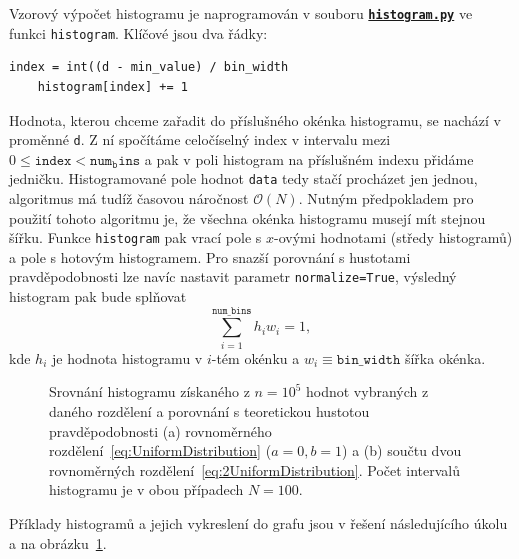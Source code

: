 \documentclass[a4paper,11pt,twoside]{article}
\def\code#1{\textnormal{\texttt{#1}}}
\def\ghfile#1#2{\textnormal{\textbf{\texttt{\href{https://github.com/PavelStransky/PCInPhysics2021/blob/main/#1#2}{#2}}}}}
\theoremstyle{red}
\theoremstyle{green}
\begin{document}
    \begin{solution}
        Vzorový výpočet histogramu je naprogramován v souboru \ghfile{python/histogram/}{histogram.py} ve funkci \code{histogram}.
        Klíčové jsou dva řádky:

        \begin{lstlisting}[style=NormalPython]
    index = int((d - min_value) / bin_width
    histogram[index] += 1\end{lstlisting}
        Hodnota, kterou chceme zařadit do příslušného okénka histogramu, se nachází v proměnné \code{d}.
        Z ní spočítáme celočíselný index v intervalu mezi $0\leq\mathtt{index}<\mathtt{num_bins}$ a pak v poli histogram na příslušném indexu přidáme jedničku.
        Histogramované pole hodnot \code{data} tedy stačí procházet jen jednou, algoritmus má tudíž časovou náročnost $\mathcal{O}(N)$.
        Nutným předpokladem pro použití tohoto algoritmu je, že všechna okénka histogramu musejí mít stejnou šířku.
        Funkce \code{histogram} pak vrací pole s $x$-ovými hodnotami (středy histogramů) a pole s hotovým histogramem.
        Pro snazší porovnání s hustotami pravděpodobnosti lze navíc nastavit parametr \code{normalize=True}, výsledný histogram pak bude splňovat
        \begin{equation}
            \sum_{i=1}^{\mathtt{num\_bins}}h_{i}w_{i}=1,
        \end{equation}
        kde $h_{i}$ je hodnota histogramu v $i$-tém okénku a $w_{i}\equiv\mathtt{bin\_width}$ šířka okénka.

        \begin{figure}[!htbp]
            \begin{subfigure}{0.49\linewidth}
                \centering{}
                \caption{}
            \end{subfigure}
            \hfill
            \begin{subfigure}{0.49\linewidth}
                \centering{}
                \caption{}
            \end{subfigure}
            \caption{
                \protect\small
                Srovnání histogramu získaného z $n=10^{5}$ hodnot vybraných z daného rozdělení a porovnání s teoretickou hustotou pravděpodobnosti (a) rovnoměrného rozdělení~\eqref{eq:UniformDistribution} ($a=0,b=1$) a (b) součtu dvou rovnoměrných rozdělení~\eqref{eq:2UniformDistribution}.
                Počet intervalů histogramu je v obou případech $N=100$.
            }
            \label{fig:Distributions}
        \end{figure}
        
        Příklady histogramů a jejich vykreslení do grafu jsou v řešení následujícího úkolu a na obrázku~\ref{fig:Distributions}.
    \end{solution}
\end{document}
